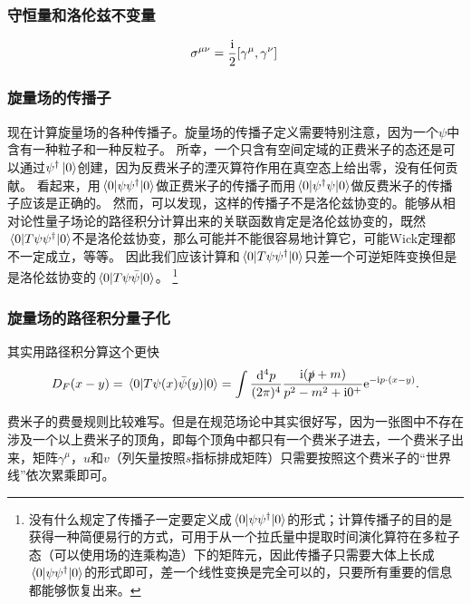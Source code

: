 \documentclass[hyperref, UTF8, a4paper]{ctexart}
\newcommand*{\ii}{\mathrm{i}}
\newcommand*{\ee}{\mathrm{e}}
\begin{document}
\subsubsection{守恒量和洛伦兹不变量}

\begin{equation}
    \sigma^{\mu \nu} = \frac{\ii}{2} \comm*{\gamma^\mu}{\gamma^\nu}
\end{equation}

\subsubsection{旋量场的传播子}

现在计算旋量场的各种传播子。旋量场的传播子定义需要特别注意，因为一个$\psi$中含有一种粒子和一种反粒子。
所幸，一个只含有空间定域的正费米子的态还是可以通过$\psi^\dagger \ket{0}$创建，因为反费米子的湮灭算符作用在真空态上给出零，没有任何贡献。
看起来，用$\mel*{0}{\psi \psi^\dagger}{0}$做正费米子的传播子而用$\mel*{0}{\psi^\dagger \psi}{0}$做反费米子的传播子应该是正确的。
然而，可以发现，这样的传播子不是洛伦兹协变的。能够从相对论性量子场论的路径积分计算出来的关联函数肯定是洛伦兹协变的，既然$\mel*{0}{T \psi \psi^\dagger}{0}$不是洛伦兹协变，那么可能并不能很容易地计算它，可能Wick定理都不一定成立，等等。
因此我们应该计算和$\mel*{0}{T \psi \psi^\dagger}{0}$只差一个可逆矩阵变换但是是洛伦兹协变的$\mel*{0}{T \psi \bar{\psi}}{0}$。%
\footnote{
    没有什么规定了传播子一定要定义成$\mel*{0}{\psi \psi^\dagger}{0}$的形式；计算传播子的目的是获得一种简便易行的方式，可用于从一个拉氏量中提取时间演化算符在多粒子态（可以使用场的连乘构造）下的矩阵元，因此传播子只需要大体上长成$\mel*{0}{\psi \psi^\dagger}{0}$的形式即可，差一个线性变换是完全可以的，只要所有重要的信息都能够恢复出来。
}%

\subsubsection{旋量场的路径积分量子化}

其实用路径积分算这个更快
\begin{equation}
    D_F(x-y) = \mel{0}{T \psi(x) \bar{\psi}(y)}{0} = \int \frac{\dd[4]{p}}{(2\pi)^4} \frac{\ii (\slashed{p} + m)}{p^2 - m^2 + \ii 0^+} \ee^{- \ii p \cdot (x- y)}.
\end{equation}

费米子的费曼规则比较难写。但是在规范场论中其实很好写，因为一张图中不存在涉及一个以上费米子的顶角，即每个顶角中都只有一个费米子进去，一个费米子出来，矩阵$\gamma^\mu$，$u$和$v$（列矢量按照$s$指标排成矩阵）只需要按照这个费米子的“世界线”依次累乘即可。
\end{document}
